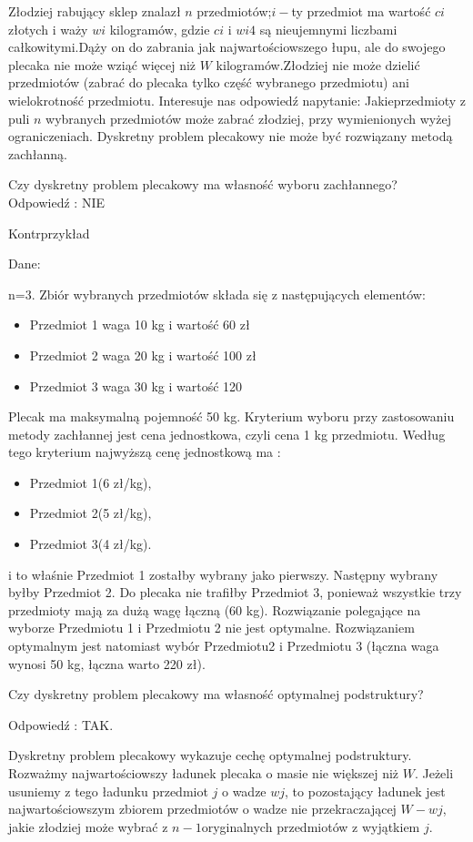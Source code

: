 \documentclass[11pt]{article}
\begin{document}
Złodziej rabujący sklep znalazł $n$ przedmiotów;$i-$ty przedmiot ma wartość $ci$ złotych i waży $wi$ kilogramów, gdzie $ci$ i $wi4$ są nieujemnymi liczbami całkowitymi.Dąży on do zabrania jak
najwartościowszego łupu, ale do swojego plecaka nie może wziąć więcej niż $W$ kilogramów.Złodziej nie może dzielić przedmiotów (zabrać do plecaka tylko część wybranego przedmiotu) ani wielokrotność przedmiotu. Interesuje nas odpowiedź napytanie: Jakieprzedmioty z puli $n$ wybranych przedmiotów może zabrać złodziej, przy wymienionych wyżej ograniczeniach.
Dyskretny problem plecakowy nie może być rozwiązany metodą zachłanną.

Czy dyskretny problem plecakowy ma własność wyboru zachłannego?
\\Odpowiedź : NIE

Kontrprzykład

Dane:

n=3. Zbiór wybranych przedmiotów składa się z następujących elementów:
\begin{itemize}
\item Przedmiot 1 waga 10 kg i wartość 60 zł
\item Przedmiot 2 waga 20 kg i wartość 100 zł
\item Przedmiot 3 waga 30 kg i wartość 120 
\end{itemize}
Plecak ma maksymalną pojemność 50 kg.
Kryterium wyboru przy zastosowaniu metody zachłannej jest cena jednostkowa, czyli cena 1
kg przedmiotu. Według tego kryterium najwyższą cenę jednostkową ma :
\begin{itemize}
\item Przedmiot 1(6 zł/kg),
\item Przedmiot 2(5 zł/kg),
\item Przedmiot 3(4 zł/kg).
\end{itemize}
i to właśnie Przedmiot 1 zostałby wybrany jako pierwszy. Następny wybrany byłby Przedmiot 2. Do plecaka nie trafiłby Przedmiot 3, ponieważ wszystkie trzy przedmioty mają za dużą wagę łączną (60 kg). Rozwiązanie polegające na wyborze Przedmiotu 1 i Przedmiotu 2 nie jest optymalne. Rozwiązaniem optymalnym jest
natomiast wybór Przedmiotu2 i Przedmiotu 3 (łączna waga wynosi 50 kg, łączna warto 220 zł).

Czy dyskretny problem plecakowy ma własność optymalnej podstruktury?

Odpowiedź : TAK.

Dyskretny problem plecakowy wykazuje cechę optymalnej podstruktury. Rozważmy najwartościowszy ładunek plecaka o masie nie większej niż $W$. Jeżeli usuniemy z tego ładunku przedmiot $j$ o wadze $wj$, to pozostający ładunek jest najwartościowszym zbiorem przedmiotów o wadze nie przekraczającej $W-wj$, jakie złodziej może wybrać z $n-1$oryginalnych przedmiotów z wyjątkiem $j$.
\end{document}
